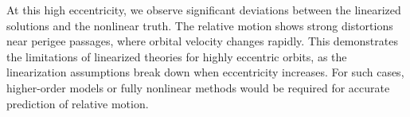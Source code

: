 
At this high eccentricity, we observe significant deviations between the linearized solutions and the nonlinear truth. The relative motion shows strong distortions near perigee passages, where orbital velocity changes rapidly. This demonstrates the limitations of linearized theories for highly eccentric orbits, as the linearization assumptions break down when eccentricity increases. For such cases, higher-order models or fully nonlinear methods would be required for accurate prediction of relative motion.